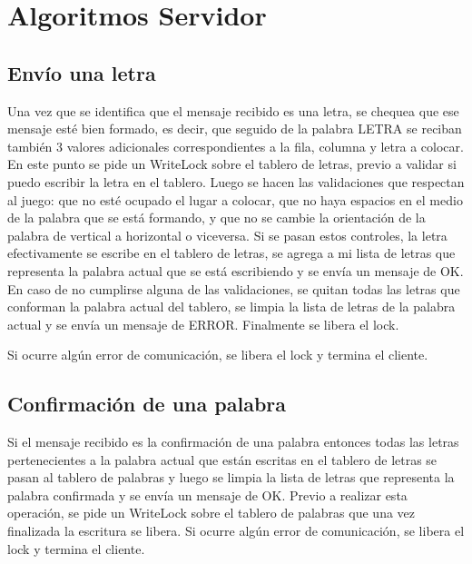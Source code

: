 \documentclass[a4,11pt]{article}
\begin{document}

\maketitle
\pagebreak
  
\tableofcontents

\pagebreak

\section{Algoritmos Servidor}

\subsection{Envío una letra}
Una vez que se identifica que el mensaje recibido es una letra, se chequea que ese mensaje esté bien formado, es decir, que seguido de la palabra LETRA se reciban también 3 valores adicionales correspondientes a la fila, columna y letra a colocar.
En este punto se pide un WriteLock sobre el tablero de letras, previo a validar si puedo escribir la letra en el tablero.
Luego se hacen las validaciones que respectan al juego: que no esté ocupado el lugar a colocar, que no haya espacios en el medio de la palabra que se está formando, y que no se cambie la orientación de la palabra de vertical a horizontal o viceversa.
Si se pasan estos controles, la letra efectivamente se escribe en el tablero de letras, se agrega a mi lista de letras que representa la palabra actual que se está escribiendo y se envía un mensaje de OK.
En caso de no cumplirse alguna de las validaciones, se quitan todas las letras que conforman la palabra actual del tablero, se limpia la lista de letras de la palabra actual y se envía un mensaje de ERROR.
Finalmente se libera el lock.

Si ocurre algún error de comunicación, se libera el lock y termina el cliente.

\subsection{Confirmación de una palabra}

Si el mensaje recibido es la confirmación de una palabra entonces todas las letras pertenecientes a la palabra actual que están escritas en el tablero de letras se pasan al tablero de palabras y luego se limpia la lista de letras que representa la palabra confirmada y se envía un mensaje de OK.
Previo a realizar esta operación, se pide un WriteLock sobre el tablero de palabras que una vez finalizada la escritura se libera.
Si ocurre algún error de comunicación, se libera el lock y termina el cliente.
\end{document}
